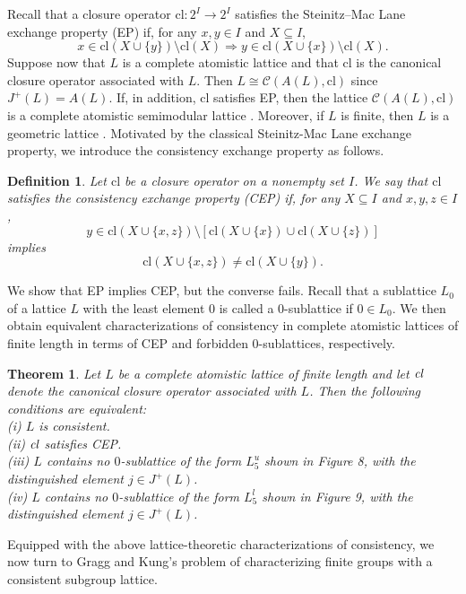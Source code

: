 \documentclass[12pt]{article}
\newtheorem{definition}{\bf Definition}[section]
\newtheorem{theorem}{\bf Theorem}[section]
\begin{document}
Recall that a closure operator 
$\mbox{cl}: 2^I\longrightarrow 2^I$ satisfies the Steinitz–Mac Lane exchange property (EP) if, for any $x,y \in I$ and $X\subseteq I$, 
$$x\in \mbox{cl}(X\cup\{y\}) \setminus \mbox{cl}(X)\Longrightarrow y\in \mbox{cl}(X\cup\{x\}) \setminus \mbox{cl}(X).$$ Suppose now that $L$ is a 
complete atomistic lattice and that $\mbox{cl}$ is the 
canonical closure operator associated with $L$.
Then $L\cong \mathcal{C}(A(L), \mbox{cl})$ since $J^{+}(L)=A(L)$. 
If, in addition, $\mbox{cl}$ satisfies EP, 
then the lattice $\mathcal{C}(A(L), \mbox{cl})$ is a complete 
atomistic semimodular lattice \cite{Crawley73}. Moreover, if $L$ is finite, 
then $L$ is a geometric lattice \cite{Birkhoff73}. 
Motivated by the classical Steinitz-Mac Lane exchange property, 
we introduce the consistency exchange property as follows.
\begin{definition}\label{WEK}
\emph{Let $\mbox{cl}$ be a closure operator on a nonempty set $I$. We say that $\mbox{cl}$ satisfies the consistency exchange property (CEP) if, for any $X\subseteq I$ and $x,y,z\in I$,
$$y\in \mbox{cl}(X\cup\{x,z\}) \setminus [\mbox{cl}(X\cup\{x\})\cup \mbox{cl}(X\cup \{z\})]$$
implies $$\mbox{cl}(X\cup\{x,z\})\neq \mbox{cl}(X\cup\{y\}).$$}
\end{definition}
We show that EP implies CEP, but the converse fails. 
Recall that a sublattice $L_0$ of a lattice $L$ with the least 
element $0$ is called a $0$-sublattice if $0\in L_0$.  We then obtain equivalent characterizations of consistency 
in complete atomistic lattices of finite length in terms 
of CEP and forbidden $0$-sublattices, respectively. 
\begin{theorem}\label{T04}
Let $L$ be a complete atomistic lattice of finite length and let $\emph{cl}$ denote the canonical closure operator associated with $L$. Then the following conditions are equivalent:\\
(i) $L$ is consistent.\\
(ii) $\emph{cl}$ satisfies CEP.\\
(iii) $L$ contains no $0$-sublattice of the form $L_{5}^{u}$ shown in Figure 8, with the distinguished element $j\in J^{+}(L)$.\\
(iv) $L$ contains no $0$-sublattice of 
the form $L_{5}^{l}$ shown in Figure 9, with the 
distinguished element $j\in J^{+}(L)$.
\end{theorem}

Equipped with the above lattice-theoretic characterizations 
of consistency, we now turn to Gragg and Kung's problem of 
characterizing finite groups with a consistent subgroup lattice.
\end{document}
